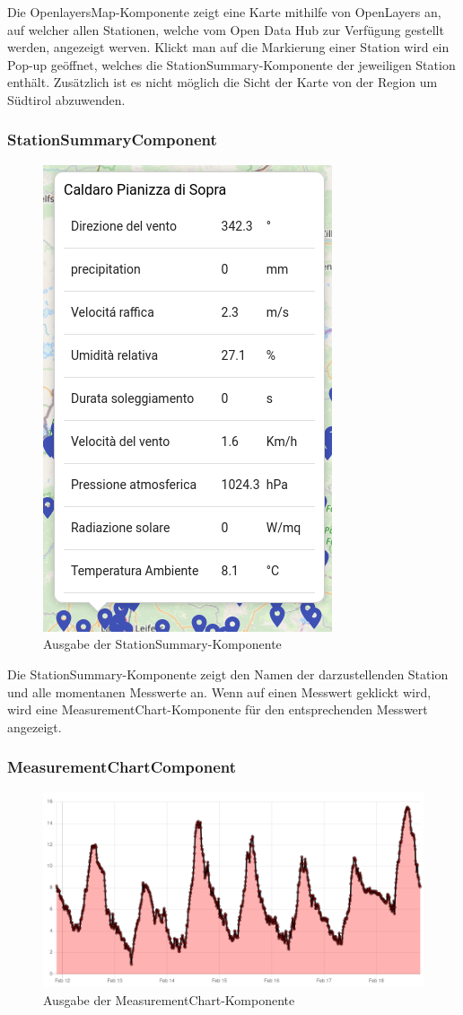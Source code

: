 \documentclass[a4paper,12pt]{article}
\begin{document}
Die OpenlayersMap-Komponente zeigt eine Karte mithilfe von OpenLayers an, auf
welcher allen Stationen, welche vom Open Data Hub zur Verfügung gestellt werden,
angezeigt werven. Klickt man auf die Markierung einer Station wird ein Pop-up
geöffnet, welches die StationSummary-Komponente der jeweiligen Station enthält.
Zusätzlich ist es nicht möglich die Sicht der Karte von der Region um Südtirol
abzuwenden.

\subsubsection{StationSummaryComponent}
\begin{figure}[H]
    \centering
    \includegraphics[width=0.3\linewidth]{assets/station-summary.png}
    \caption{Ausgabe der StationSummary-Komponente}
    \label{fig:station-summary}
\end{figure}

Die StationSummary-Komponente zeigt den Namen der darzustellenden Station und
alle momentanen Messwerte an. Wenn auf einen Messwert geklickt wird, wird eine
MeasurementChart-Komponente für den entsprechenden Messwert angezeigt.

\subsubsection{MeasurementChartComponent}
\begin{figure}[H]
    \centering
    \includegraphics[width=0.8\linewidth]{assets/measurement-chart.png}
    \caption{Ausgabe der MeasurementChart-Komponente}
    \label{fig:measurement-chart}
\end{figure}
\end{document}
